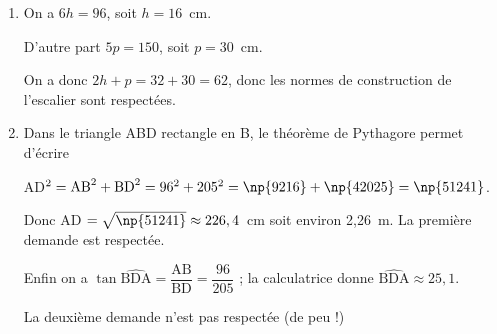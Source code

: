 \begin{enumerate}
\item %
On a $6h = 96$, soit $h = 16$~cm.

D’autre part $5p = 150$, soit $p = 30$~cm.

On a donc $2h + p =  32 + 30 = 62$, donc les normes de construction de l'escalier sont respectées.


\item %
Dans le triangle ABD rectangle en B, le théorème de Pythagore permet d’écrire 

AD$^2 = \text{AB}^2 + \text{BD}^2 = 96^2 + 205^2 = \np{9216} + \np{42025} = \np{51241}$.

Donc AD $ = \sqrt{\np{51241}} \approx 226,4$~cm soit environ 2,26~m. La première demande est respectée.

Enfin on a $\tan \widehat{\text{BDA}} = \dfrac{\text{AB}}{\text{BD}} = \dfrac{96}{205}$ ; la calculatrice donne $\widehat{\text{BDA}}  \approx 25,1$\degres.

La deuxième demande n’est pas respectée (de peu !)
\end{enumerate}
 
\bigskip  

